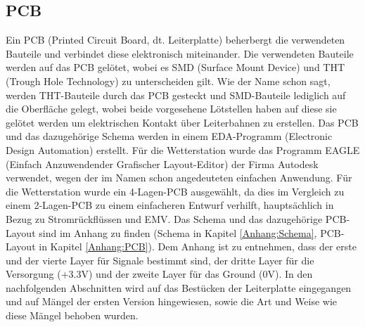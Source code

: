 \subsection{PCB}
\label{subsec:PCB}
Ein PCB (Printed Circuit Board, dt. Leiterplatte) beherbergt die verwendeten Bauteile und verbindet diese elektronisch miteinander. Die verwendeten Bauteile werden auf das PCB gelötet, wobei es SMD (Surface Mount Device) und THT (Trough Hole Technology) zu unterscheiden gilt. Wie der Name schon sagt, werden THT-Bauteile durch das PCB gesteckt und SMD-Bauteile lediglich auf die Oberfläche gelegt, wobei beide vorgesehene Lötstellen haben auf diese sie gelötet werden um elektrischen Kontakt über Leiterbahnen zu erstellen.
Das PCB und das dazugehörige Schema werden in einem EDA-Programm (Electronic Design Automation) erstellt. Für die Wetterstation wurde das Programm EAGLE (Einfach Anzuwendender Grafischer Layout-Editor) der Firma Autodesk verwendet, wegen der im Namen schon angedeuteten einfachen Anwendung. Für die Wetterstation wurde ein 4-Lagen-PCB ausgewählt, da dies im Vergleich zu einem 2-Lagen-PCB zu einem einfacheren Entwurf verhilft, hauptsächlich in Bezug zu Stromrückflüssen und EMV. Das Schema und das dazugehörige PCB-Layout sind im Anhang zu finden (Schema in Kapitel \ref{Anhang:Schema}, PCB-Layout in Kapitel \ref{Anhang:PCB}). Dem Anhang ist zu entnehmen, dass der erste und der vierte Layer für Signale bestimmt sind, der dritte Layer für die Versorgung (+3.3V) und der zweite Layer für das Ground (0V). In den nachfolgenden Abschnitten wird auf das Bestücken der Leiterplatte eingegangen und auf Mängel der ersten Version hingewiesen, sowie die Art und Weise wie diese Mängel behoben wurden.
